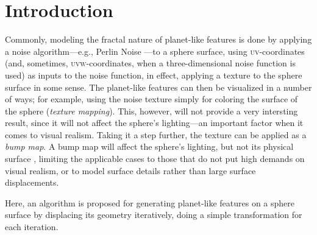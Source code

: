\chapter{Introduction}

Commonly, modeling the fractal nature of planet-like features is done by applying a noise
algorithm---e.g., Perlin Noise \citep{perlin83}---to a sphere surface, using \textsc{uv}-coordinates
(and, sometimes, \textsc{uvw}-coordinates, when a three-dimensional noise function is used) as
inputs to the noise function, in effect, applying a texture to the sphere surface in some sense.
The planet-like features can then be visualized in a number of ways; for example, using the noise
texture simply for coloring the surface of the sphere (\textit{texture mapping}).  This, however,
will not provide a very intersting result, since it will not affect the sphere's lighting---an
important factor when it comes to visual realism.  Taking it a step further, the texture can be
applied as a \textit{bump map}.  A bump map will affect the sphere's lighting, but not its physical
surface \citep{blinn78}, limiting the applicable cases to those that do not put high demands on
visual realism, or to model surface details rather than large surface displacements.

Here, an algorithm is proposed for generating planet-like features on a sphere surface by displacing
its geometry iteratively, doing a simple transformation for each iteration.
